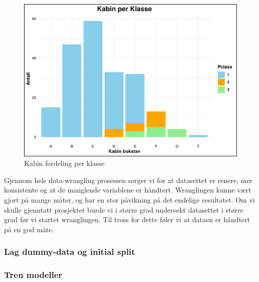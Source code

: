 \documentclass[
]{article}
\newenvironment{Shaded}{\begin{snugshade}}{\end{snugshade}}
\newcommand{\FunctionTok}[1]{\textcolor[rgb]{0.13,0.29,0.53}{\textbf{#1}}}
\newcommand{\NormalTok}[1]{#1}
\newcommand{\OtherTok}[1]{\textcolor[rgb]{0.56,0.35,0.01}{#1}}
\newcommand{\SpecialCharTok}[1]{\textcolor[rgb]{0.81,0.36,0.00}{\textbf{#1}}}
\begin{document}
\begin{figure}[H]

{\centering \includegraphics[width=0.8\linewidth]{presentation_files/figure-latex/unnamed-chunk-7-1} 

}

\caption{Kabin fordeling per klasse}\label{fig:unnamed-chunk-7}
\end{figure}

Gjennom hele data-wrangling prosessen sørger vi for at datasettet er
renere, mer konsistente og at de manglende variablene er håndtert.
Wranglingen kunne vært gjort på mange måter, og har en stor påvikning på
det endelige resultatet. Om vi skulle gjenntatt prosjektet burde vi i
større grad undersøkt datasettet i større grad før vi startet
wranglingen. Til tross for dette føler vi at dataen er håndtert på en
god måte.

\subsubsection{Lag dummy-data og initial
split}\label{lag-dummy-data-og-initial-split}

\begin{Shaded}
\end{Shaded}

\subsubsection{Tren modeller}\label{tren-modeller}
\end{document}
